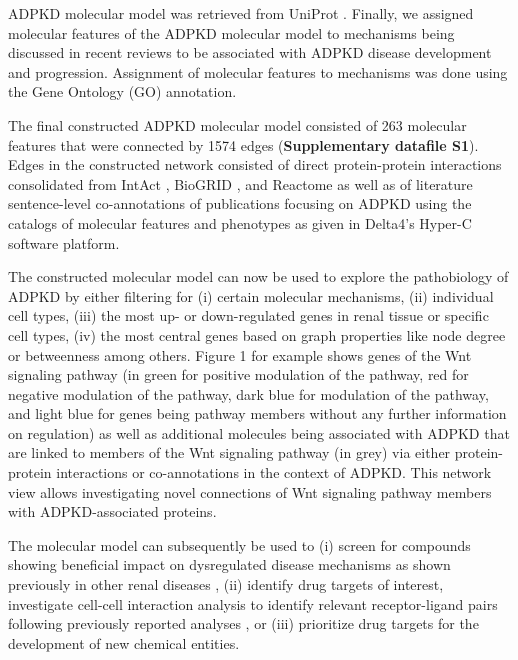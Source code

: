 ADPKD molecular model was retrieved from UniProt \citep{ahmadUniProtWebsiteAPI2025}. Finally, we assigned molecular features of the ADPKD molecular model to mechanisms being discussed in recent reviews to be associated with ADPKD disease development and progression. Assignment of molecular features to mechanisms was done using the Gene Ontology (GO) annotation.

The final constructed ADPKD molecular model consisted of 263 molecular features that were connected by 1574 edges (\textbf{Supplementary datafile S1}). Edges in the constructed network consisted of direct protein-protein interactions consolidated from IntAct \citep{orchardMIntActProjectIntAct2014}, BioGRID \citep{oughtredBioGRIDDatabaseComprehensive2021}, and Reactome \citep{milacicReactomePathwayKnowledgebase2024} as well as of literature sentence-level co-annotations of publications focusing on ADPKD using the catalogs of molecular features and phenotypes as given in Delta4's Hyper-C software platform.

The constructed molecular model can now be used to explore the pathobiology of ADPKD by either filtering for (i) certain molecular mechanisms, (ii) individual cell types, (iii) the most up- or down-regulated genes in renal tissue or specific cell types, (iv) the most central genes based on graph properties like node degree or betweenness among others. Figure 1 for example shows genes of the Wnt signaling pathway (in green for positive modulation of the pathway, red for negative modulation of the pathway, dark blue for modulation of the pathway, and light blue for genes being pathway members without any further information on regulation) as well as additional molecules being associated with ADPKD that are linked to members of the Wnt signaling pathway (in grey) via either protein-protein interactions or co-annotations in the context of ADPKD. This network view allows investigating novel connections of Wnt signaling pathway members with ADPKD-associated proteins.

The molecular model can subsequently be used to (i) screen for compounds showing beneficial impact on dysregulated disease mechanisms as shown previously in other renal diseases \citep{gebeshuberComputationalDrugRepositioning2023}, (ii) identify drug targets of interest, investigate cell-cell interaction analysis to identify relevant receptor-ligand pairs following previously reported analyses \citep{evgeniouMetaAnalysisHumanTranscriptomics2021}, or (iii) prioritize drug targets for the development of new chemical entities.


